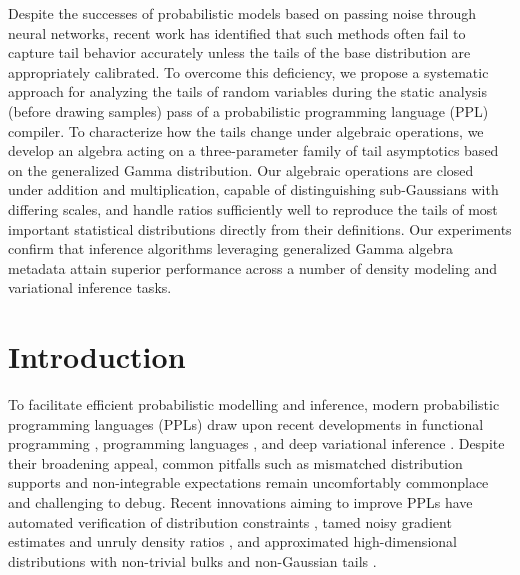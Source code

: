 \documentclass[thesis.tex]{subfiles}
\begin{document}

	Despite the successes of probabilistic models based on passing noise through
	neural networks, recent work has identified that such methods often fail to
	capture tail behavior accurately unless the tails of the base distribution
	are appropriately calibrated. To overcome this deficiency, we propose a
	systematic approach for analyzing the tails of random variables during the
	static analysis (before drawing samples) pass of a probabilistic programming
	language (PPL) compiler. To characterize how the tails change under
	algebraic operations, we develop an algebra acting on a three-parameter
	family of tail asymptotics based on the generalized Gamma distribution. Our
	algebraic operations are closed under addition and multiplication, capable
	of distinguishing sub-Gaussians with differing scales, and handle ratios
	sufficiently well to reproduce the tails of most important statistical
	distributions directly from their definitions. Our experiments confirm that
	inference algorithms leveraging generalized Gamma algebra metadata attain
	superior performance across a number of density modeling and variational
	inference tasks.

\section{Introduction}

To facilitate efficient probabilistic modelling and inference, modern probabilistic programming languages (PPLs) draw upon recent developments in functional programming \citep{tolpin2016design},
programming languages \citep{bernstein2019static}, 
and deep variational inference \citep{bingham2019pyro}.
Despite their broadening appeal, common pitfalls such as mismatched
distribution supports \citep{lee2019towards} and non-integrable expectations
\citep{wang2018variational,vehtari2015pareto,yao2018yes} remain uncomfortably
commonplace and challenging to debug.
Recent innovations aiming to improve PPLs have automated verification of
distribution constraints \citep{lee2019towards}, tamed noisy gradient estimates
\citep{eslami2016attend} and unruly density ratios
\citep{vehtari2015pareto,wang2018variational}, and approximated high-dimensional
distributions with non-trivial bulks \citep{papamakarios2021normalizing} and non-Gaussian tails \cite{jaini2020tails}. 
\end{document}
